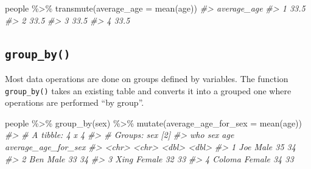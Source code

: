 \documentclass[
]{book}
\newenvironment{Shaded}{\begin{snugshade}}{\end{snugshade}}
\newcommand{\AttributeTok}[1]{\textcolor[rgb]{0.77,0.63,0.00}{#1}}
\newcommand{\CommentTok}[1]{\textcolor[rgb]{0.56,0.35,0.01}{\textit{#1}}}
\newcommand{\FunctionTok}[1]{\textcolor[rgb]{0.00,0.00,0.00}{#1}}
\newcommand{\NormalTok}[1]{#1}
\newcommand{\SpecialCharTok}[1]{\textcolor[rgb]{0.00,0.00,0.00}{#1}}
\begin{document}
\begin{Shaded}
\begin{Highlighting}[]
\NormalTok{people }\SpecialCharTok{\%\textgreater{}\%} \FunctionTok{transmute}\NormalTok{(}\AttributeTok{average\_age =} \FunctionTok{mean}\NormalTok{(age))}
\CommentTok{\#\textgreater{}   average\_age}
\CommentTok{\#\textgreater{} 1        33.5}
\CommentTok{\#\textgreater{} 2        33.5}
\CommentTok{\#\textgreater{} 3        33.5}
\CommentTok{\#\textgreater{} 4        33.5}
\end{Highlighting}
\end{Shaded}

\hypertarget{group_by}{%
\subsection*{\texorpdfstring{\texttt{group\_by()}}{group\_by()}}\label{group_by}}

Most data operations are done on groups defined by variables. The function \texttt{group\_by()} takes an existing table and converts it into a grouped one where operations are performed ``by group''.

\begin{Shaded}
\begin{Highlighting}[]
\NormalTok{people }\SpecialCharTok{\%\textgreater{}\%} 
  \FunctionTok{group\_by}\NormalTok{(sex) }\SpecialCharTok{\%\textgreater{}\%}
  \FunctionTok{mutate}\NormalTok{(}\AttributeTok{average\_age\_for\_sex =} \FunctionTok{mean}\NormalTok{(age)) }
\CommentTok{\#\textgreater{} \# A tibble: 4 x 4}
\CommentTok{\#\textgreater{} \# Groups:   sex [2]}
\CommentTok{\#\textgreater{}   who    sex      age average\_age\_for\_sex}
\CommentTok{\#\textgreater{}   \textless{}chr\textgreater{}  \textless{}chr\textgreater{}  \textless{}dbl\textgreater{}               \textless{}dbl\textgreater{}}
\CommentTok{\#\textgreater{} 1 Joe    Male      35                  34}
\CommentTok{\#\textgreater{} 2 Ben    Male      33                  34}
\CommentTok{\#\textgreater{} 3 Xing   Female    32                  33}
\CommentTok{\#\textgreater{} 4 Coloma Female    34                  33}
\end{Highlighting}
\end{Shaded}
\end{document}
